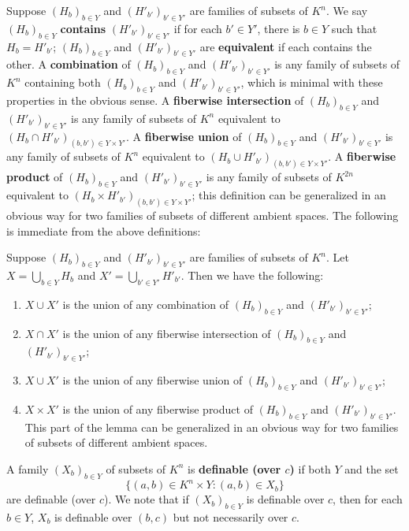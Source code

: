 Suppose $(H_b)_{ b \in Y}$ and $(H'_{b'})_{ b' \in Y'}$ are families of subsets of $K^{n}$. We say $(H_b)_{ b \in Y}$ {\bf contains}  $(H'_{b'})_{ b' \in Y'}$ if for each $b' \in Y'$, there is $b\in Y$ such that $H_b = H'_{b'}$; $(H_b)_{ b \in Y}$ and $(H'_{b'})_{ b' \in Y'}$ are {\bf equivalent} if each contains the other.
A {\bf combination} of $(H_b)_{ b \in Y}$ and $(H'_{b'})_{ b' \in Y'}$ is any family of subsets of $K^n$ containing both $(H_b)_{ b \in Y}$ and $(H'_{b'})_{ b' \in Y'}$, which is minimal with these properties in the obvious sense.
A {\bf fiberwise intersection} of $(H_b)_{ b \in Y}$  and $(H'_{b'})_{ b' \in Y'}$ is any family of subsets of $K^n$ equivalent to $( H_b \cap H'_{b'})_{(b,b') \in Y \times Y'}$. 
A {\bf fiberwise union} of $(H_b)_{ b \in Y}$ and $(H'_{b'})_{ b' \in Y'}$ is any family of subsets of $K^n$ equivalent to $( H_b \cup H'_{b'})_{(b,b') \in Y \times Y'}$. 
A {\bf fiberwise product} of $(H_b)_{ b \in Y}$ and $(H'_{b'})_{ b' \in Y'}$ is any family of subsets of $K^{2n}$ equivalent to $( H_b \times H'_{b'})_{(b,b') \in Y \times Y'}$; this definition can be generalized in an obvious way for two families of subsets of different ambient spaces. The following is immediate from the above definitions:

\begin{lem} \label{fiber}
Suppose $(H_b)_{ b \in Y}$  and $(H'_{b'})_{ b' \in Y'}$ are families of subsets of $K^n$. Let $X= \bigcup_{b \in Y} H_b$ and $X'= \bigcup_{b' \in Y'} H'_{b'}$. Then we have the following:
\begin{enumerate}
\item $X \cup X'$ is the union of any combination of $(H_b)_{ b \in Y}$ and $(H'_{b'})_{ b' \in Y'}$;
\item $X \cap X'$ is the union of any fiberwise intersection of  $(H_b)_{ b \in Y}$ and $(H'_{b'})_{ b' \in Y'}$;
\item $X \cup X'$ is the union of any fiberwise union of $(H_b)_{ b \in Y}$ and $(H'_{b'})_{ b' \in Y'}$;
\item $X \times X'$ is the union of any fiberwise product of $(H_b)_{ b \in Y}$ and $(H'_{b'})_{ b' \in Y'}$. This part of the lemma can be generalized in an obvious way for two families of subsets of different ambient spaces.
\end{enumerate}
\end{lem}

\noindent
A family $(X_b)_{ b \in Y}$ of subsets of $K^n$ is { \bf definable (over $c$)} if both $Y$ and the set  $$\big\{(a,b) \in K^n \times Y : (a,b) \in X_b  \big\} $$ are definable (over $c$).
We note that if $(X_b)_{ b \in Y}$ is definable over $c$, then for each $b \in Y$, $X_b$ is definable over $(b,c)$ but not necessarily over $c$. 

